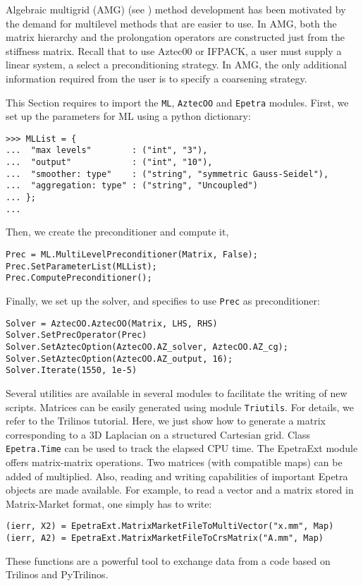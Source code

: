 \documentclass[10pt,relax]{SANDreport}
\begin{document}
Algebraic multigrid (AMG)  (see \cite[Section 8]{Briggs2000}) method
development has been motivated by the demand for multilevel methods that are
easier to use.  In AMG, both the matrix hierarchy and the prolongation
operators are constructed just from the stiffness matrix.  Recall that to use
Aztec00 or IFPACK,  a user must supply a linear system, a select a
preconditioning strategy.  In AMG, the only additional information required
from the user is to specify a coarsening strategy.

This Section requires to import the {\tt ML}, {\tt AztecOO} and {\tt Epetra}
modules. First, we set up the parameters for ML using a python dictionary:
\begin{verbatim}
>>> MLList = {
...  "max levels"        : ("int", "3"),
...  "output"            : ("int", "10"),
...  "smoother: type"    : ("string", "symmetric Gauss-Seidel"),
...  "aggregation: type" : ("string", "Uncoupled")
... };
... 
\end{verbatim}
Then, we create the preconditioner and compute it,
\begin{verbatim}
Prec = ML.MultiLevelPreconditioner(Matrix, False);
Prec.SetParameterList(MLList);
Prec.ComputePreconditioner();
\end{verbatim}
Finally, we set up the solver, and specifies to use \verb!Prec! as
preconditioner:
\begin{verbatim}
Solver = AztecOO.AztecOO(Matrix, LHS, RHS)
Solver.SetPrecOperator(Prec)
Solver.SetAztecOption(AztecOO.AZ_solver, AztecOO.AZ_cg);
Solver.SetAztecOption(AztecOO.AZ_output, 16);
Solver.Iterate(1550, 1e-5)
\end{verbatim}

\bigskip

Several utilities are available in several modules to facilitate the writing
of new scripts.
Matrices can be easily generated using module {\tt Triutils}. For
details, we refer to the Trilinos tutorial. Here, we just show how to generate
a matrix corresponding to a 3D Laplacian on a structured Cartesian grid.
Class {\tt Epetra.Time} can be used to track the elapsed CPU time.
The EpetraExt module offers matrix-matrix operations. Two matrices
(with compatible maps) can be added of multiplied. Also, reading and writing
capabilities of important Epetra objects are made available. For example, to
read a vector and a matrix stored in Matrix-Market format, one simply has to
write:
\begin{verbatim}
(ierr, X2) = EpetraExt.MatrixMarketFileToMultiVector("x.mm", Map)
(ierr, A2) = EpetraExt.MatrixMarketFileToCrsMatrix("A.mm", Map)
\end{verbatim}
These functions are a powerful tool to exchange data from a code based on
Trilinos and PyTrilinos.
\end{document}
